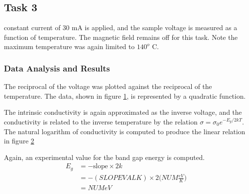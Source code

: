 \documentclass[a4paper]{article}
\begin{document}
\subsection{Task 3}
 constant current of 30 mA is applied, and the sample voltage is
measured as a function of temperature. The magnetic field
remains off for this task. Note the maximum temperature was again limited to $140^o$ C.

\subsubsection{Data Analysis and Results}
The reciprocal of the voltage was plotted against the 
reciprocal of the temperature. The data, shown in figure \ref{task33plot}, is represented by a quadratic function.

\begin{figure}[H]
\centering
\label{task33plot}
\end{figure}

The intrinsic conductivity is again approximated as the inverse voltage, and the conductivity is related to the inverse temperature by the relation $\sigma = \sigma_0 e^{-E_g/2kT}$. The natural logarithm of conductivity is computed to produce the linear relation in figure \ref{task33plotLINEAR}

\begin{figure}[H]
\centering
\label{task33plotLINEAR}
\end{figure}

Again, an experimental value for the band gap energy is computed.
\begin{align*}
E_g &= - \text{slope} \times 2k \\
    &= - (SLOPEVAL K) \times 2 
       \Big( NUM \frac{eV}{K} \Big) \\
    &= NUM eV \\
\end{align*}
\end{document}
